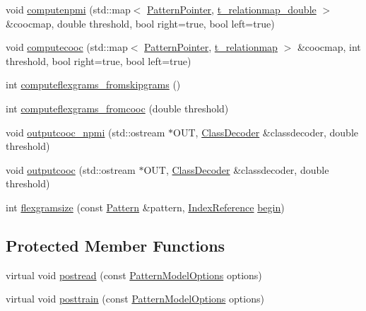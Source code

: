 \begin{DoxyCompactItemize}
\item 
void \hyperlink{classIndexedPatternModel_aac497b4ee70d9bf9156e69c35f3573b3}{computenpmi} (std\+::map$<$ \hyperlink{classPatternPointer}{Pattern\+Pointer}, \hyperlink{patternmodel_8h_ae13b52c8cf777358f19da17c90c7dac0}{t\+\_\+relationmap\+\_\+double} $>$ \&coocmap, double threshold, bool right=true, bool left=true)
\item 
void \hyperlink{classIndexedPatternModel_a1052616f5b2316f9ce364e5d176554ac}{computecooc} (std\+::map$<$ \hyperlink{classPatternPointer}{Pattern\+Pointer}, \hyperlink{patternmodel_8h_a8695a2b10be5a74c827cd6c11bd46fb9}{t\+\_\+relationmap} $>$ \&coocmap, int threshold, bool right=true, bool left=true)
\item 
int \hyperlink{classIndexedPatternModel_a838f141f5f7cf888ce44bfc1b7a14ba3}{computeflexgrams\+\_\+fromskipgrams} ()
\item 
int \hyperlink{classIndexedPatternModel_a7b6915f17b1afe98e84e4380a00f40e4}{computeflexgrams\+\_\+fromcooc} (double threshold)
\item 
void \hyperlink{classIndexedPatternModel_a17e2553ba9520ac45bac77f0948b1b21}{outputcooc\+\_\+npmi} (std\+::ostream $\ast$O\+U\+T, \hyperlink{classClassDecoder}{Class\+Decoder} \&classdecoder, double threshold)
\item 
void \hyperlink{classIndexedPatternModel_a7029fb323b1ef87bcf821050e78e5cd9}{outputcooc} (std\+::ostream $\ast$O\+U\+T, \hyperlink{classClassDecoder}{Class\+Decoder} \&classdecoder, double threshold)
\item 
int \hyperlink{classIndexedPatternModel_a8edee00c483b931ea640d1861e7c8f71}{flexgramsize} (const \hyperlink{classPattern}{Pattern} \&pattern, \hyperlink{classIndexReference}{Index\+Reference} \hyperlink{benchmarks_8cpp_ac7fa37beaab207886901b58632083209}{begin})
\end{DoxyCompactItemize}
\subsection*{Protected Member Functions}
\begin{DoxyCompactItemize}
\item 
virtual void \hyperlink{classIndexedPatternModel_a14708a972c0c3297421b370bbdc75b65}{postread} (const \hyperlink{classPatternModelOptions}{Pattern\+Model\+Options} options)
\item 
virtual void \hyperlink{classIndexedPatternModel_a5314a6b877df1447d28128fb9d9e67b3}{posttrain} (const \hyperlink{classPatternModelOptions}{Pattern\+Model\+Options} options)
\end{DoxyCompactItemize}
